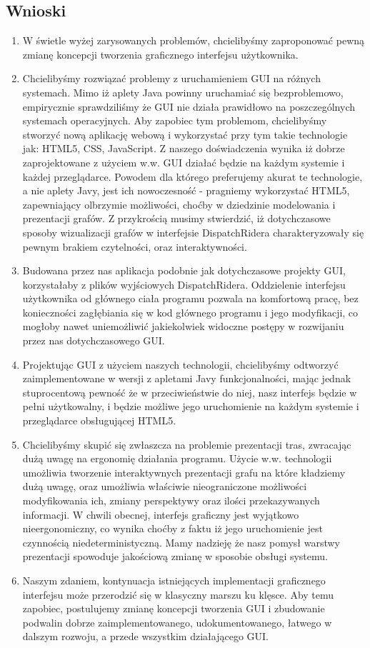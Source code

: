 \subsection{Wnioski}
\begin{enumerate}
\item W świetle wyżej zarysowanych problemów, chcielibyśmy zaproponować pewną zmianę koncepcji tworzenia graficznego interfejsu użytkownika.
\item Chcielibyśmy rozwiązać problemy z uruchamieniem GUI na różnych systemach. Mimo iż aplety Java powinny uruchamiać się bezproblemowo, empirycznie sprawdziliśmy że GUI nie działa prawidłowo na poszczególnych systemach operacyjnych. Aby zapobiec tym problemom, chcielibyśmy stworzyć nową aplikację webową i wykorzystać przy tym takie technologie jak: HTML5, CSS, JavaScript. Z naszego doświadczenia wynika iż dobrze zaprojektowane z użyciem w.w. GUI działać będzie na każdym systemie i każdej przeglądarce. Powodem dla którego preferujemy akurat te technologie, a nie aplety Javy, jest ich nowoczesność - pragniemy wykorzystać HTML5, zapewniający olbrzymie możliwości, choćby w dziedzinie modelowania i prezentacji grafów. Z przykrością musimy stwierdzić, iż dotychczasowe sposoby wizualizacji grafów w interfejsie DispatchRidera charakteryzowały się pewnym brakiem czytelności, oraz interaktywności.
\item Budowana przez nas aplikacja podobnie jak dotychczasowe projekty GUI, korzystałaby z plików wyjściowych DispatchRidera. Oddzielenie interfejsu użytkownika od głównego ciała programu pozwala na komfortową pracę, bez konieczności zagłębiania się w kod głównego programu i jego modyfikacji, co mogłoby nawet uniemożliwić jakiekolwiek widoczne postępy w rozwijaniu przez nas dotychczasowego GUI.
\item Projektując GUI z użyciem naszych technologii, chcielibyśmy odtworzyć zaimplementowane w wersji z apletami Javy funkcjonalności, mając jednak stuprocentową pewność że w przeciwieństwie do niej, nasz interfejs będzie w pełni użytkowalny, i będzie możliwe jego uruchomienie na każdym systemie i przeglądarce obsługującej HTML5.
\item Chcielibyśmy skupić się zwłaszcza na problemie prezentacji tras, zwracając dużą uwagę na ergonomię działania programu. Użycie w.w. technologii umożliwia tworzenie interaktywnych prezentacji grafu na które kładziemy dużą uwagę, oraz umożliwia właściwie nieograniczone możliwości modyfikowania ich, zmiany perspektywy oraz ilości przekazywanych informacji. W chwili obecnej, interfejs graficzny jest wyjątkowo nieergonomiczny, co wynika choćby z faktu iż jego uruchomienie jest czynnością niedeterministyczną. Mamy nadzieję że nasz pomysł warstwy prezentacji spowoduje jakościową zmianę w sposobie obsługi systemu.
\item Naszym zdaniem, kontynuacja istniejących implementacji graficznego interfejsu może przerodzić się w klasyczny marszu ku klęsce. Aby temu zapobiec, postulujemy zmianę koncepcji tworzenia GUI i zbudowanie podwalin dobrze zaimplementowanego, udokumentowanego, łatwego w dalszym rozwoju, a przede wszystkim działającego GUI.
\end{enumerate}
